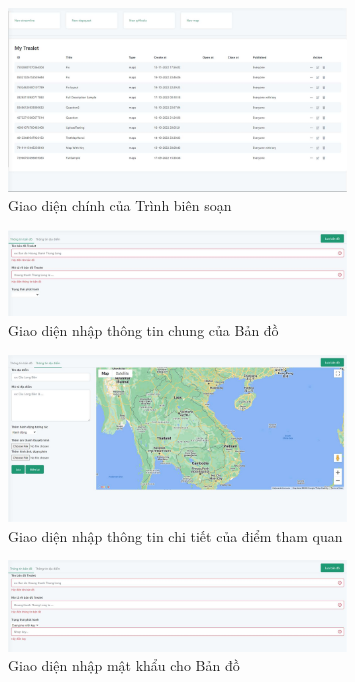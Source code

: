 \begin{figure}[h]
    \centering
    \includegraphics[width=0.8\textwidth]{figures/editor-main.jpg}
    \caption{Giao diện chính của Trình biên soạn}
    \label{fig:editor-main}
\end{figure}

\begin{figure}[h]
    \centering
    \includegraphics[width=0.8\textwidth]{figures/editor-map-info.jpg}
    \caption{Giao diện nhập thông tin chung của Bản đồ}
    \label{fig:editor-map-info}
\end{figure}

\begin{figure}[h]
    \centering
    \includegraphics[width=0.8\textwidth]{figures/editor-point-info.jpg}
    \caption{Giao diện nhập thông tin chi tiết của điểm tham quan}
    \label{fig:editor-point-info}
\end{figure}

\begin{figure}[h]
    \centering
    \includegraphics[width=0.8\textwidth]{figures/editor-map-password.jpg}
    \caption{Giao diện nhập mật khẩu cho Bản đồ}
    \label{fig:editor-map-password}
\end{figure}


